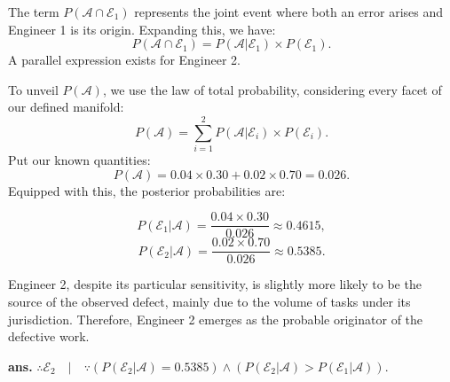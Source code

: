 \documentclass[12pt]{article}
\begin{document}
The term \( P(\mathcal{A} \cap \mathcal{E}_1) \) represents the joint event where both an error arises and Engineer 1 is its origin. Expanding this, we have:
\[
P(\mathcal{A} \cap \mathcal{E}_1) = P(\mathcal{A}|\mathcal{E}_1) \times P(\mathcal{E}_1).
\]
A parallel expression exists for Engineer 2.

To unveil \( P(\mathcal{A}) \), we use the law of total probability, considering every facet of our defined manifold:
\[
P(\mathcal{A}) = \sum_{i=1}^{2} P(\mathcal{A}|\mathcal{E}_i) \times P(\mathcal{E}_i).
\]
Put our known quantities:
\[
P(\mathcal{A}) = 0.04 \times 0.30 + 0.02 \times 0.70 = 0.026.
\]
Equipped with this, the posterior probabilities are: \AnswerTag

\[
P(\mathcal{E}_1|\mathcal{A}) = \frac{0.04 \times 0.30}{0.026} \approx 0.4615,
\]
\[
P(\mathcal{E}_2|\mathcal{A}) = \frac{0.02 \times 0.70}{0.026} \approx 0.5385.
\]

Engineer 2, despite its particular sensitivity, is slightly more likely to be the source of the observed defect, mainly due to the volume of tasks under its jurisdiction. Therefore, Engineer 2 emerges as the probable originator of the defective work.


\vfill
\begin{flushright}
\textbf{ans.} \(\therefore \mathcal{E}_2 \quad \big| \quad \because \left( P(\mathcal{E}_2|\mathcal{A}) = 0.5385 \right) \land \left( P(\mathcal{E}_2|\mathcal{A}) > P(\mathcal{E}_1|\mathcal{A}) \right).\)
\end{flushright}
\end{document}
